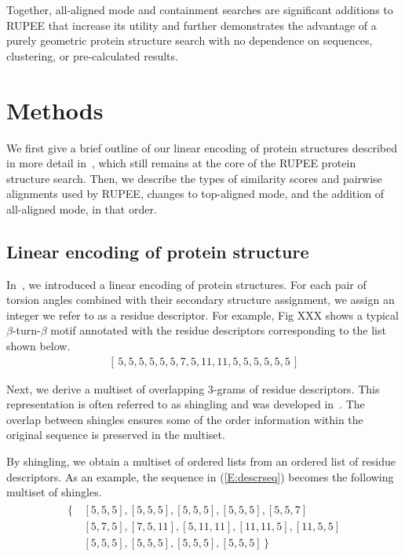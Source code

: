 \documentclass[10pt,letterpaper]{article}
\begin{document}
Together, all-aligned mode and containment searches are significant additions to RUPEE that increase its utility and further demonstrates the advantage of a purely geometric protein structure search with no dependence on sequences, clustering, or pre-calculated results.

\section*{Methods}

We first give a brief outline of our linear encoding of protein structures described in more detail in~\cite{Ayoub2019}, which still remains at the core of the RUPEE protein structure search. 
Then, we describe the types of similarity scores and pairwise alignments used by RUPEE, changes to top-aligned mode, and the addition of all-aligned mode, in that order.

\subsection*{Linear encoding of protein structure}

In~\cite{Ayoub2019}, we introduced a linear encoding of protein structures.
For each pair of torsion angles combined with their secondary structure assignment, we assign an integer we refer to as a residue descriptor.
For example, Fig XXX shows a typical $\beta$-turn-$\beta$ motif annotated with the residue descriptors corresponding to the list shown below.
\begin{gather}\label{E:descrseq} 
    [\, 5, 5, 5, 5, 5, 5, 7, 5, 11, 11, 5, 5, 5, 5, 5, 5 \,]
\end{gather}

Next, we derive a multiset of overlapping 3-grams of residue descriptors. 
This representation is often referred to as shingling and was developed in~\cite{Broder1997a}. 
The overlap between shingles ensures some of the order information within the original sequence is preserved in the multiset. 

By shingling, we obtain a multiset of ordered lists from an ordered list of residue descriptors. 
As an example, the sequence in (\ref{E:descrseq}) becomes the following multiset of shingles. 
\begin{align}\label{E:shinglebag}
    \begin{split}
        \{\,&[5, 5, 5], [5, 5, 5], [5, 5, 5], [5, 5, 5], [5, 5, 7] \\
            & [5, 7, 5], [7, 5, 11], [5, 11, 11], [11, 11, 5], [11, 5, 5] \\
            & [5, 5, 5], [5, 5, 5], [5, 5, 5], [5, 5, 5] \,\}
    \end{split}
\end{align}
\end{document}
